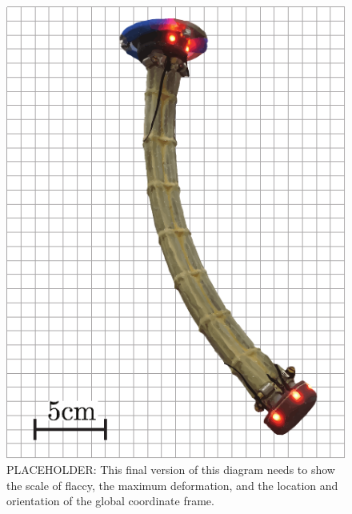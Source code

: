 \begin{figure}
    \centering
    \includegraphics[width=0.7\linewidth]{figures/flaccy_scale.pdf}
    \caption{PLACEHOLDER: This final version of this diagram needs to show the scale of flaccy, the maximum deformation, and the location and orientation of the global coordinate frame.}
    \label{fig:flaccy}
\end{figure}